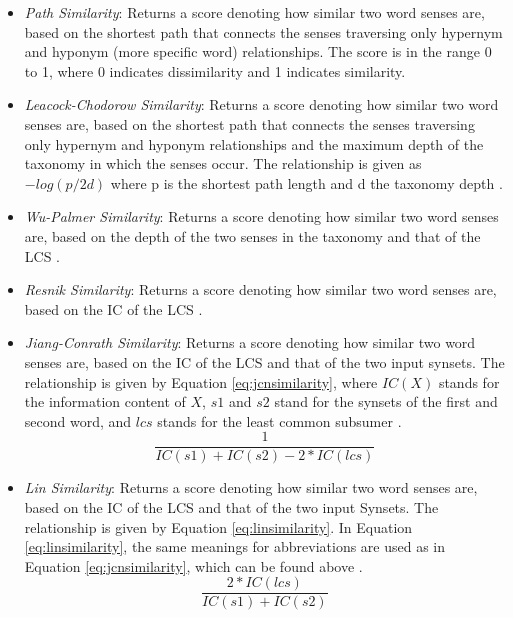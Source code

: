 \documentclass{article}
\begin{document}
\begin{itemize}
	\item \emph{Path Similarity}: Returns a score denoting how similar two word senses are, based on the shortest path that connects the senses traversing only hypernym and hyponym (more specific word) relationships. The score is in the range 0 to 1, where 0 indicates dissimilarity and 1 indicates similarity.
	\item \emph{Leacock-Chodorow Similarity}: Returns a score denoting how similar two word senses are, based on the shortest path that connects the senses traversing only hypernym and hyponym relationships and the maximum depth of the taxonomy in which the senses occur. The relationship is given as \(-log(p/2d)\) where p is the shortest path length and d the taxonomy depth \cite{leacock1998combining}.
	\item \emph{Wu-Palmer Similarity}: Returns a score denoting how similar two word senses are, based on the depth of the two senses in the taxonomy and that of the LCS \cite{wu1994verbs}.
	\item \emph{Resnik Similarity}: Returns a score denoting how similar two word senses are, based on the IC of the LCS \cite{resnik1995using}.
	\item \emph{Jiang-Conrath Similarity}: Returns a score denoting how similar two word senses are, based on the IC of the LCS and that of the two input synsets. The relationship is given by Equation \ref{eq:jcnsimilarity}, where $IC(X)$ stands for the information content of $X$, $s1$ and $s2$ stand for the synsets of the first and second word, and $lcs$ stands for the least common subsumer \cite{jiang1997semantic}.
\begin{equation} \label{eq:jcnsimilarity}
	\frac{1} {IC(s1) + IC(s2) - 2 * IC(lcs)}
\end{equation}
	\item \emph{Lin Similarity}: Returns a score denoting how similar two word senses are, based on the IC of the LCS and that of the two input Synsets. The relationship is given by Equation \ref{eq:linsimilarity}. In Equation \ref{eq:linsimilarity}, the same meanings for abbreviations are used as in Equation \ref{eq:jcnsimilarity}, which can be found above \cite{lin1998information}.
\begin{equation} \label{eq:linsimilarity}
	\frac{2 * IC(lcs)} {IC(s1) + IC(s2)} 
\end{equation} 
\end{itemize}
\end{document}
